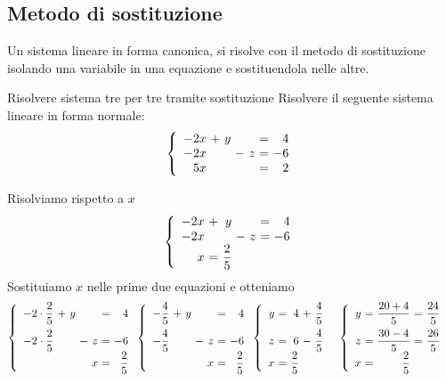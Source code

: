 \subsection{Metodo di sostituzione}
\label{sec:Sostituzionetre}
Un sistema lineare in forma canonica, si risolve con il metodo di sostituzione isolando una variabile in una equazione e sostituendola nelle altre. 
\begin{esempiot}{Risolvere sistema tre per tre tramite sostituzione}{}
Risolvere il seguente sistema lineare in forma normale:
\[\left\{
\begin{array}{*{3}{r@{~}c@{~}}r}
-2x & + & y &  &  & =&4\\
-2x & & & - & z & =&-6\\
5x & &  &  &  & =&2\\
\end{array}\right.\]
\end{esempiot}
Risolviamo rispetto a $x$
\[\left\{
\begin{array}{*{3}{r@{~}c@{~}}r}
-2x & + & y &  &  & =&4\\
-2x & & & - & z & =&-6\\
 x &= & \dfrac{2}{5} &  &  & &\\
\end{array}\right.\]
Sostituiamo $x$ nelle prime due equazioni e otteniamo
\[\left\{
\begin{array}{*{3}{r@{~}c@{~}}r}
-2\cdot\dfrac{2}{5} & + & y &  &  & =&4\\[.28cm]
-2\cdot\dfrac{2}{5} & & & - & z & =&-6\\
 & &  &  & x &= &\dfrac{2}{5}\\
\end{array}\right.\left\{
\begin{array}{*{3}{r@{~}c@{~}}r}
-\dfrac{4}{5} & + & y &  &  & =&4\\[.28cm]
-\dfrac{4}{5} & & & - & z & =&-6\\
& &  &  & x &= &\dfrac{2}{5}\\
\end{array}\right.\left\{
\begin{array}{*{3}{r@{~}c@{~}}r}
 y& = & 4 & +  & \dfrac{4}{5}&\\[.28cm]
z&= &6& -&\dfrac{4}{5} &&\\
x&= &\dfrac{2}{5}  &  & &&\\
\end{array}\right.\left\{
\begin{array}{*{3}{r@{~}c@{~}}r}
y&=&\dfrac{20+4}{5} & = &\dfrac{24}{5} &\\[.28cm]
z&=&\dfrac{30-4}{5}&=&\dfrac{26}{5} & &\\
x&=&\dfrac{2}{5}&& &&\\
\end{array}\right.\]
